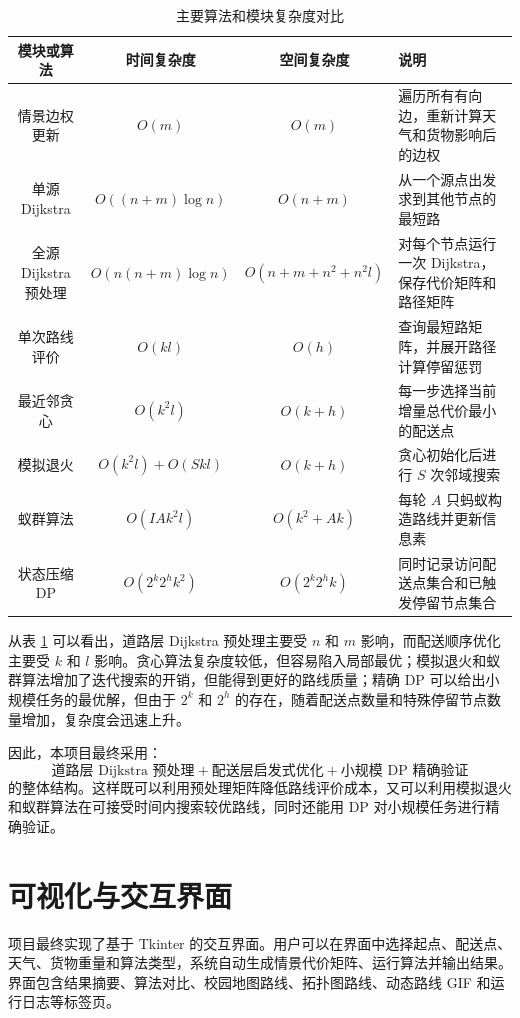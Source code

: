 \documentclass[12pt,a4paper,UTF8]{article}
\begin{document}
\begin{table}[H]
\centering
\caption{主要算法和模块复杂度对比}
\label{tab:complexity_summary}
\small
\renewcommand{\arraystretch}{1.2}
\begin{tabularx}{\textwidth}{c|c|c|X}
\hline
模块或算法 & 时间复杂度 & 空间复杂度 & 说明 \\
\hline
情景边权更新 & $O(m)$ & $O(m)$ & 遍历所有有向边，重新计算天气和货物影响后的边权 \\
\hline
单源 Dijkstra & $O((n+m)\log n)$ & $O(n+m)$ & 从一个源点出发求到其他节点的最短路 \\
\hline
全源 Dijkstra 预处理 & $O(n(n+m)\log n)$ & $O(n+m+n^2+n^2l)$ & 对每个节点运行一次 Dijkstra，保存代价矩阵和路径矩阵 \\
\hline
单次路线评价 & $O(kl)$ & $O(h)$ & 查询最短路矩阵，并展开路径计算停留惩罚 \\
\hline
最近邻贪心 & $O(k^2l)$ & $O(k+h)$ & 每一步选择当前增量总代价最小的配送点 \\
\hline
模拟退火 & $O(k^2l)+O(Skl)$ & $O(k+h)$ & 贪心初始化后进行 $S$ 次邻域搜索 \\
\hline
蚁群算法 & $O(IAk^2l)$ & $O(k^2+Ak)$ & 每轮 $A$ 只蚂蚁构造路线并更新信息素 \\
\hline
状态压缩 DP & $O(2^k2^hk^2)$ & $O(2^k2^hk)$ & 同时记录访问配送点集合和已触发停留节点集合 \\
\hline
\end{tabularx}
\end{table}

从表 \ref{tab:complexity_summary} 可以看出，道路层 Dijkstra 预处理主要受 $n$ 和 $m$ 影响，而配送顺序优化主要受 $k$ 和 $l$ 影响。贪心算法复杂度较低，但容易陷入局部最优；模拟退火和蚁群算法增加了迭代搜索的开销，但能得到更好的路线质量；精确 DP 可以给出小规模任务的最优解，但由于 $2^k$ 和 $2^h$ 的存在，随着配送点数量和特殊停留节点数量增加，复杂度会迅速上升。

因此，本项目最终采用：
\[
    \text{道路层 Dijkstra 预处理}
    +
    \text{配送层启发式优化}
    +
    \text{小规模 DP 精确验证}
\]
的整体结构。这样既可以利用预处理矩阵降低路线评价成本，又可以利用模拟退火和蚁群算法在可接受时间内搜索较优路线，同时还能用 DP 对小规模任务进行精确验证。




\section{可视化与交互界面}

项目最终实现了基于 Tkinter 的交互界面。用户可以在界面中选择起点、配送点、天气、货物重量和算法类型，系统自动生成情景代价矩阵、运行算法并输出结果。界面包含结果摘要、算法对比、校园地图路线、拓扑图路线、动态路线 GIF 和运行日志等标签页。
\end{document}
